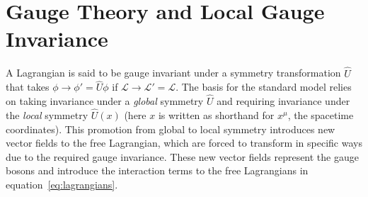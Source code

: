 \section{Gauge Theory and Local Gauge Invariance} \label{sec:sm_theory_gauge}
A Lagrangian is said to be gauge invariant under a symmetry transformation $\hat{U}$ that takes $\phi\to\phi'=\hat{U}\phi$ if $\mathcal{L}\to\mathcal{L}'=\mathcal{L}$. The basis for the standard model relies on taking invariance under a \textit{global} symmetry $\hat{U}$ and requiring invariance under the \textit{local} symmetry $\hat{U}(x)$ (here $x$ is written as shorthand for $x^\mu$, the spacetime coordinates). This promotion from global to local symmetry introduces new vector fields to the free Lagrangian, which are forced to transform in specific ways due to the required gauge invariance. These new vector fields represent the gauge bosons and introduce the interaction terms to the free Lagrangians in equation~\ref{eq:lagrangians}.

